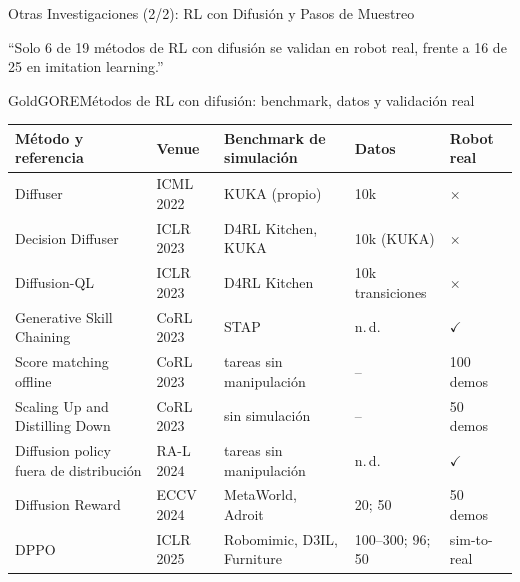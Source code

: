\documentclass[aspectratio=169,10pt,xcolor={dvipsnames,table}]{beamer}
\newcommand{\BannerFont}{\fontsize{7.5}{9.2}\selectfont\bfseries}       %
\newcommand{\BannerArc}{1.5pt}             %
\newcommand{\BannerRule}{0.5pt}            %
\newcommand{\BannerLeftRule}{2.5pt}        %
\newcommand{\BannerCentral}[2][UCNCyan]{%
  \begin{tcolorbox}[
    enhanced,
    colback=#1!10,
    colframe=#1,
    boxrule=\BannerRule,
    leftrule=\BannerLeftRule,
    arc=\BannerArc,
    top=0.35mm, bottom=0.35mm, left=2mm, right=2mm
  ]
    {\BannerFont\raggedright\textcolor{UCNBlue}{#2}\par}
  \end{tcolorbox}%
  \vspace{-2.5mm}%
}
\newcommand{\CheckMark}{\textcolor{AgriGreen}{$\checkmark$}}
\newcommand{\CrossMark}{\textcolor{AlertRed}{$\times$}}
\newcommand{\TabFont}{\fontsize{5.3}{6.4}\selectfont}                    %
\begin{document}
\begin{frame}{Otras Investigaciones (2/2): RL con Difusión y Pasos de Muestreo}
  \BannerCentral[GoldGORE]{``Solo 6 de 19 métodos de RL con difusión se validan en robot real, frente a 16 de 25 en imitation learning.''}
  \vspace{0.8mm}
  \begin{Card}{GoldGORE}{Métodos de RL con difusión: benchmark, datos y validación real}
    {\TabFont
    \setlength{\tabcolsep}{1.4pt}
    \renewcommand{\arraystretch}{1.0}
    \begin{tabular}{@{}L{48mm} L{17mm} L{36mm} L{26mm} L{14mm}@{}}
      \toprule
      \textbf{Método y referencia} & \textbf{Venue} & \textbf{Benchmark de simulación} & \textbf{Datos} & \textbf{Robot real} \\
      \midrule
      Diffuser \cite{janner2022diffuser} & ICML 2022 & KUKA (propio) & 10k & \CrossMark \\
      Decision Diffuser \cite{ajay2023decision} & ICLR 2023 & D4RL Kitchen, KUKA & 10k (KUKA) & \CrossMark \\
      Diffusion-QL \cite{wang2023diffusionql} & ICLR 2023 & D4RL Kitchen & 10k transiciones & \CrossMark \\
      Generative Skill Chaining \cite{mishra2023gsc} & CoRL 2023 & STAP & n.\,d. & \CheckMark \\
      Score matching offline \cite{suh2023fighting} & CoRL 2023 & tareas sin manipulación & -- & 100 demos \\
      Scaling Up and Distilling Down \cite{ha2023scaling} & CoRL 2023 & sin simulación & -- & 50 demos \\
      Diffusion policy fuera de distribución \cite{ada2024ood} & RA-L 2024 & tareas sin manipulación & n.\,d. & \CheckMark \\
      Diffusion Reward \cite{huang2024diffusionreward} & ECCV 2024 & MetaWorld, Adroit & 20; 50 & 50 demos \\
       DPPO \cite{ren2025dppo} & ICLR 2025 & Robomimic, D3IL, Furniture & 100--300; 96; 50 & sim-to-real \\
      \bottomrule
    \end{tabular}\par
}
\end{Card}
\end{frame}
\end{document}
